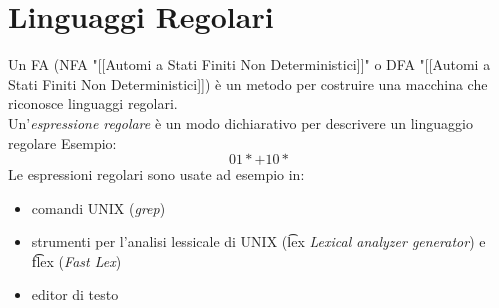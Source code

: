 \section{Linguaggi Regolari}
Un FA (NFA "[[Automi a Stati Finiti Non Deterministici]]" o DFA "[[Automi a Stati Finiti Non Deterministici]]) è un metodo per costruire una macchina che riconosce linguaggi regolari.\\
Un'\textit{espressione regolare} è un modo dichiarativo per descrivere un linguaggio regolare
Esempio: $$01* + 10*$$
Le espressioni regolari sono usate ad esempio in:
\begin{itemize}
	\item comandi UNIX (\textit{grep})
	\item strumenti per l'analisi lessicale di UNIX (\t{lex} \textit{Lexical analyzer generator}) e \t{flex} (\textit{Fast Lex})
	\item editor di testo
\end{itemize}
